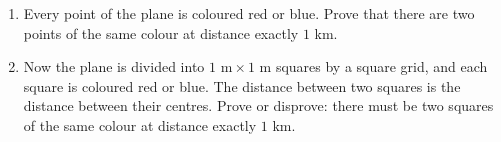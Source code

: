 \begin{enumerate}
\item[(a)] Every point of the plane is coloured red or blue. Prove that there are two points of the same colour at distance exactly $1$ km.
\item[(b)] Now the plane is divided into $1\text{ m}\times1\text{ m}$ squares by a square grid, and each square is coloured red or blue. The distance between two squares is the distance between their centres. Prove or disprove: there must be two squares of the same colour at distance exactly $1$ km.
\end{enumerate}

